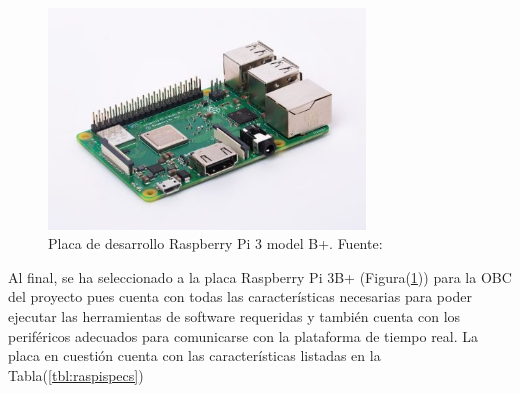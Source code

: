     \begin{figure}[!h] 
        \centering
        \includegraphics[width=0.75\textwidth]{img/raspi}
        \caption[Placa de desarrollo Raspberry Pi 3 model B+]{Placa de desarrollo Raspberry Pi 3 model B+. Fuente: \cite{raspi} }
        \label{fig:raspi}
    \end{figure}

    Al final, se ha seleccionado a la placa Raspberry Pi 3B+ (Figura(\ref{fig:raspi})) para la OBC del proyecto pues cuenta con todas las características 
    necesarias para poder ejecutar las herramientas de software requeridas y también cuenta con los periféricos adecuados para 
    comunicarse con la plataforma de tiempo real. La placa en cuestión cuenta con las características listadas en la Tabla(\ref{tbl:raspispecs})

